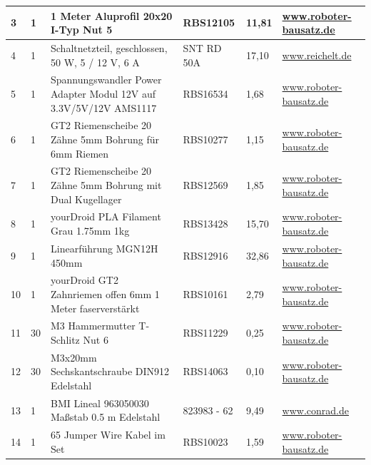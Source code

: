 \begin{itemize}
\begin{center}
\begin{tabularx}{\textwidth}{|p{0.4cm}|p{0.4cm}|X|X|p{1cm}|X|}
			3 & 1 & 1 Meter Aluprofil 20x20 I-Typ Nut 5 & RBS12105 & 11,81 & \href{https://www.roboter-bausatz.de/p/1-meter-aluprofil-20x20-i-typ-nut-5}{www.roboter-bausatz.de} \\ 
			\hline
			4 & 1 & Schaltnetzteil, geschlossen, 50 W, 5 / 12 V, 6 A & SNT RD 50A
			& 17,10 & \href{https://www.reichelt.de}{www.reichelt.de} \\ 
			\hline
			5 & 1 & Spannungswandler Power Adapter Modul 12V auf 3.3V/5V/12V AMS1117
			& RBS16534 & 1,68 & \href{https://www.roboter-bausatz.de/p/spannungswandler-power-adapter-modul-12v-auf-3.3v-5v-12v-ams1117}{www.roboter-bausatz.de} \\ 
			\hline
			6 & 1 & GT2 Riemenscheibe 20 Zähne 5mm Bohrung für 6mm Riemen & RBS10277 & 1,15 & \href{https://www.roboter-bausatz.de/p/gt2-riemenscheibe-20-zaehne-5mm-bohrung-fuer-6mm-riemen}{www.roboter-bausatz.de} \\ 
			\hline
			7 & 1 & GT2 Riemenscheibe 20 Zähne 5mm Bohrung mit Dual Kugellager & RBS12569 & 1,85 &	\href{https://www.roboter-bausatz.de/p/gt2-riemenscheibe-20-zaehne-5mm-bohrung-mit-dual-kugellager}{www.roboter-bausatz.de} \\ 
			\hline
			8 & 1 & yourDroid PLA Filament Grau 1.75mm 1kg  & RBS13428 & 15,70 & \href{https://www.roboter-bausatz.de/p/yourdroid-pla-filament-grau-1.75mm-1kg}{www.roboter-bausatz.de} \\ 
			\hline
			9 & 1 & Linearführung MGN12H 450mm & RBS12916 & 32,86 & \href{https://www.roboter-bausatz.de/p/linearfuehrung-mgn12h-450mm}{www.roboter-bausatz.de} \\
			\hline
			10 & 1 & yourDroid GT2 Zahnriemen offen 6mm 1 Meter faserverstärkt & RBS10161 & 2,79 & \href{https://www.roboter-bausatz.de/p/yourdroid-gt2-zahnriemen-offen-6mm-1-meter-faserverstaerkt}{www.roboter-bausatz.de} \\
			\hline
			11 & 30 & M3 Hammermutter T-Schlitz Nut 6 &  RBS11229 & 0,25 & \href{https://www.roboter-bausatz.de/p/m3-hammermutter-t-schlitz-nut-6}{www.roboter-bausatz.de} \\
			\hline
			12 & 30 & M3x20mm Sechskantschraube DIN912 Edelstahl & RBS14063 & 0,10 &
			\href{https://www.roboter-bausatz.de/p/m3x20mm-sechskantschraube-din912-edelstahl}{www.roboter-bausatz.de} \\
			\hline
			13 & 1 & BMI Lineal 963050030 Maßstab 0.5 m Edelstahl & 823983 - 62 & 9,49 & \href{https://www.conrad.de/}{www.conrad.de} \\
			\hline
			14 & 1 & 65 Jumper Wire Kabel im Set & RBS10023 & 1,59 & \href{https://www.roboter-bausatz.de/p/65-jumper-wire-kabel-im-set}{www.roboter-bausatz.de} \\

\end{tabularx}
\end{center}
\end{itemize}

